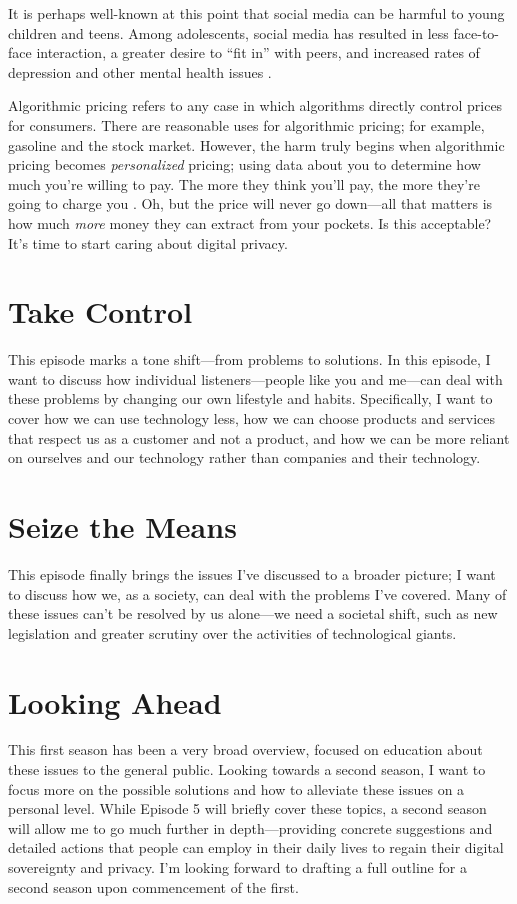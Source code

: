 \documentclass[12pt]{article}
\begin{document}
It is perhaps well-known at this point that social media can be harmful to young
children and teens. Among adolescents, social media has resulted in less
face-to-face interaction, a greater desire to ``fit in'' with peers, and
increased rates of depression and other mental health issues \autocite{Allen2019:Social}.

Algorithmic pricing refers to any case in which algorithms directly control
prices for consumers. There are reasonable uses for algorithmic pricing; for
example, gasoline and the stock market. However, the harm truly begins when
algorithmic pricing becomes \emph{personalized} pricing; using data about you to
determine how much you're willing to pay. The more they think you'll pay, the
more they're going to charge you \autocite{Bar-Gill2019:Symposium}. Oh, but the
price will never go down---all that matters is how much \emph{more} money they
can extract from your pockets. Is this acceptable? It's time to start caring
about digital privacy.

\section{Take Control}
This episode marks a tone shift---from problems to solutions. In this episode, I
want to discuss how individual listeners---people like you and me---can deal
with these problems by changing our own lifestyle and habits. Specifically, I
want to cover how we can use technology less, how we can choose products and
services that respect us as a customer and not a product, and how we can be more
reliant on ourselves and our technology rather than companies and their technology.

\section{Seize the Means}
This episode finally brings the issues I've discussed to a broader picture; I
want to discuss how we, as a society, can deal with the problems I've covered.
Many of these issues can't be resolved by us alone---we need a societal shift,
such as new legislation and greater scrutiny over the activities of technological giants.

\section*{Looking Ahead}
This first season has been a very broad overview, focused on education about
these issues to the general public. Looking towards a second season, I want to
focus more on the possible solutions and how to alleviate these issues on a
personal level. While Episode 5 will briefly cover these topics, a second season
will allow me to go much further in depth---providing concrete suggestions and
detailed actions that people can employ in their daily lives to regain their
digital sovereignty and privacy. I'm looking forward to drafting a full outline
for a second season upon commencement of the first.
\end{document}
